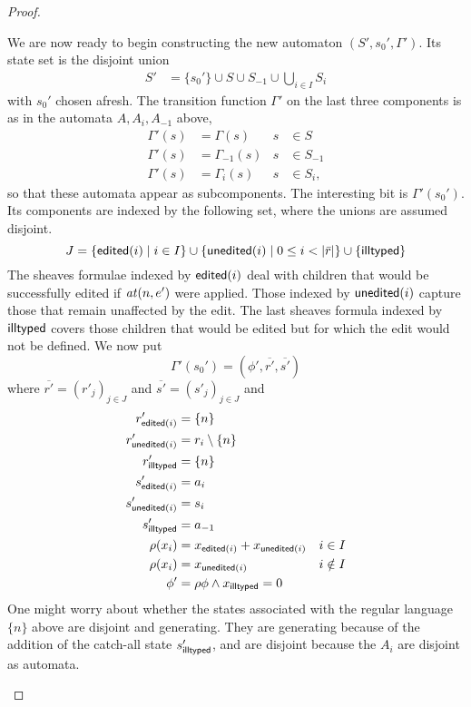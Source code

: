 \begin{proof}
\begin{itemize}
We are now ready to begin constructing the new automaton $(S',s_0',\Gamma')$. Its state set is the disjoint union
\begin{align*}
    S' &= \{s_0'\} \cup S \cup S_{-1} \cup \bigcup_{i \in I}S_i
\end{align*}
with $s_0'$ chosen afresh. The transition function $\Gamma'$ on the last three components is as in the automata $A, A_i, A_{-1}$ above,
\begin{align*}
    \Gamma'(s) &= \Gamma(s) & s &\in S\\
    \Gamma'(s) &= \Gamma_{-1}(s) & s &\in S_{-1} \\
    \Gamma'(s) &= \Gamma_i(s) & s &\in S_i ,
\end{align*}
so that these automata appear as subcomponents. The interesting bit is
$\Gamma'(s_0')$. Its components are indexed by the following set, where the unions are assumed disjoint.
\[
J =
\{\mathsf{edited}(i) \mid i \in I\} \cup \{\mathsf{unedited}(i) \mid 0 \le i < |\bar r|\}\cup\{\mathsf{illtyped}\}
\]
The sheaves formulae indexed by $\mathsf{edited}(i)$ deal with children that would be successfully edited if $\mathit{at}(n,e')$ were applied. Those indexed by $\mathsf{unedited}(i)$ capture those that remain unaffected by the edit. The last sheaves formula indexed by $\mathsf{illtyped}$ covers those children that would be edited but for which the edit would not be defined. We now put
\[
    \Gamma'(s_0') = (\phi',\overline{r'},\overline{s'})
\]
where $\overline{r'}=(r'_j)_{j\in J}$ and  $\overline{s'}=(s'_j)_{j\in J}$ and
\begin{align*}
    r'_{\mathsf{edited}(i)}      &= \{n\} \\
    r'_{\mathsf{unedited}(i)}    &= r_i \setminus \{n\} \\
    r'_{\mathsf{illtyped}}       &= \{n\} \\
    s'_{\mathsf{edited}(i)}      &= a_i \\
    s'_{\mathsf{unedited}(i)}    &= s_i \\
    s'_{\mathsf{illtyped}}       &= a_{-1} \\
    \rho(x_i) &= x_{\mathsf{edited}(i)}+x_{\mathsf{unedited}(i)} & i \in I \\
    \rho(x_i) &= x_{\mathsf{unedited}(i)} & i \notin I \\
    \phi' &= \rho\phi \land x_{\mathsf{illtyped}} = 0
\end{align*}
One might worry about whether the states associated with the regular
language $\{n\}$ above are disjoint and generating. They are generating
because of the addition of the catch-all state $s'_{\mathsf{illtyped}}$, and are
disjoint because the $A_i$ are disjoint as automata.


\end{itemize}
\end{proof}
